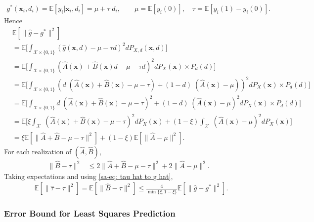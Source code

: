 \documentclass[10pt]{article}
\def\bx{\mathbf{x}}
\def\X{\mathcal{X}}
\def\E{\mathbb{E}}
\theoremstyle{definition}
\theoremstyle{remark}
\begin{document}
\begin{align*}
    g^{\ast}(\bx_i, d_i) = \E[y_i|\bx_i, d_i] = \mu + \tau \; d_i, \qquad \mu = \E[y_i(0)], \quad \tau = \E[y_i(1) - y_i(0)].
\end{align*}
Hence
\begin{align}\label{sa-eq: tau hat to g hat}
    \nonumber & \E [\lVert \hat{g} - g^{\ast} \rVert^2] \\
    \nonumber & = \E \bigg[\int_{\X \times \{0,1\}} (\hat{g}(\bx,d) - \mu - \tau d)^2 d P_{X,d}(\bx,d)\bigg] \\
    \nonumber & = \E \bigg[\int_{\X \times \{0,1\}} (\hat{A}(\bx) + \hat{B}(\bx) d - \mu - \tau d)^2 d P_X(\bx) \times P_d(d)\bigg] \\
    \nonumber & = \E \bigg[\int_{\X \times \{0,1\}} ( d \;(\hat{A}(\bx) + \hat{B}(\bx) - \mu - \tau) + (1 - d) \; (\hat{A}(\bx) - \mu))^2 d P_X(\bx) \times P_d(d)\bigg] \\
    \nonumber & = \E \bigg[\int_{\X \times \{0,1\}} d \; (\hat{A}(\bx) + \hat{B}(\bx) - \mu - \tau)^2 + (1 - d) \; (\hat{A}(\bx) - \mu)^2 d P_X(\bx) \times P_d(d)\bigg] \\
    \nonumber & = \E \bigg[ \xi \int_{\X}  \; (\hat{A}(\bx) + \hat{B}(\bx) - \mu - \tau)^2 d P_X(\bx) + (1 - \xi) \int_{\X} \; (\hat{A}(\bx) - \mu)^2 d P_X(\bx) \bigg] \\
    & = \xi \E[\lVert \hat{A} + \hat{B} - \mu - \tau \rVert^2] + (1 - \xi) \E[\lVert \hat{A} - \mu \rVert^2].
\end{align}
For each realization of $(\hat A,\hat B)$,
\begin{align*}
    \lVert \hat B-\tau\rVert^2
    &\leq 2\lVert \hat A+\hat B-\mu-\tau\rVert^2
        +2\lVert \hat A-\mu\rVert^2.
\end{align*}
Taking expectations and using \eqref{sa-eq: tau hat to g hat},
\begin{align*}
    & \E [\lVert \hat{\tau} - \tau \rVert^2] 
    = \E [\lVert \hat{B} - \tau \rVert^2 ] 
    \leq \frac{4}{\min\{\xi, 1 - \xi\}} \E [\lVert \hat{g} - g^{\ast} \rVert^2].
\end{align*}

\subsubsection*{Error Bound for Least Squares Prediction}
\end{document}
